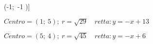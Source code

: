 \begin{esercizio}
\begin{enumeratea}
{\left (-1;~-1 \right )\)]}
  \item  \(Centro=\left (1;~5 \right );~r = \sqrt{29} \quad
           retta: y = - x 
+13\)\\
  \makebox[\linewidth][r]
   {[\(x^2 + y^2 -2x -10y -3 = 0; \quad A = \left (3;~10 \right );~B = 
\left (6;~7 \right )\)]}
  \item  \(Centro=\left (5;~4 \right );~r = \sqrt{45} \quad
           retta: y = - x +6\)\\
 \makebox[\linewidth][r]
   {[\(x^2 + y^2 -10x -8y -4 = 0; \quad A = \left (8;~-2 \right );~B = 
\left (-1;~7 \right )\)]}
 \end{enumeratea}
\end{esercizio}


